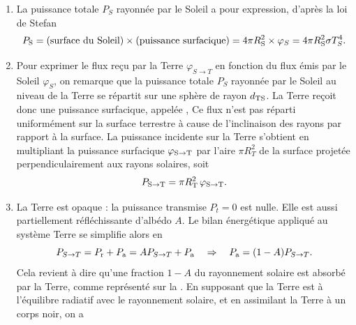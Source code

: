 \documentclass[12pt,fancy]{cours}
\begin{document}
\begin{enumerate}
  \item La puissance totale $P_S$ rayonnée par le Soleil a pour expression, d'après la loi de Stefan
  \begin{equation}
  P_{\rm{S}}= \text{(surface du Soleil)} \times \text{(puissance surfacique)} = 4\pi R_{\rm{S}}^2\times \varphi_S = 4\pi R_{\rm{S}}^2 \sigma T_S^4.
  \end{equation}
  \item
  Pour exprimer le flux reçu par la Terre $\varphi_{S\rightarrow T}$ en fonction du flux émis par le Soleil $\varphi_S$, on remarque que la puissance totale $P_S$ rayonnée par le Soleil au niveau de la Terre se répartit sur une sphère de rayon $d_{\rm TS}$. La Terre reçoit donc une puissance surfacique, appelée ,
  Ce flux n'est pas réparti uniformément sur la surface terrestre à cause de l'inclinaison des rayons par rapport à la surface. La puissance incidente sur la Terre s'obtient en multipliant la puissance surfacique $\varphi_{\rm{S}\to\rm{T}}$ par l'aire $\pi R_T^2$ de la surface projetée perpendiculairement aux rayons solaires, soit
  \begin{equation}\label{eq:P_terre}
  P_{\rm{S}\to\rm{T}}=\pi  R_{\rm{T}}^2 \,\varphi_{\rm{S}\to\rm{T}}.
  \end{equation}
\item
La Terre est opaque : la puissance transmise $P_t = 0$ est nulle. Elle est aussi partiellement réfléchissante d'albédo $A$. Le bilan énergétique appliqué au système Terre se simplifie alors en
\begin{equation}\label{eq:bilan}
P_{S\rightarrow T} = P_{\rm r} + P_{\rm a} = A P_{S\rightarrow T} + P_{\rm a} \quad \Rightarrow \quad P_{\rm a} = (1-A) P_{S \rightarrow T}.
\end{equation}
Cela revient à dire qu'une fraction $1-A$ du rayonnement solaire est absorbé par la Terre, comme représenté sur la .
En supposant que la Terre est à l'équilibre radiatif avec le rayonnement solaire, et en assimilant la Terre à un corps noir, on a
\begin{equation}\label{eq:eq}

\end{equation}
\end{enumerate}
\end{document}

